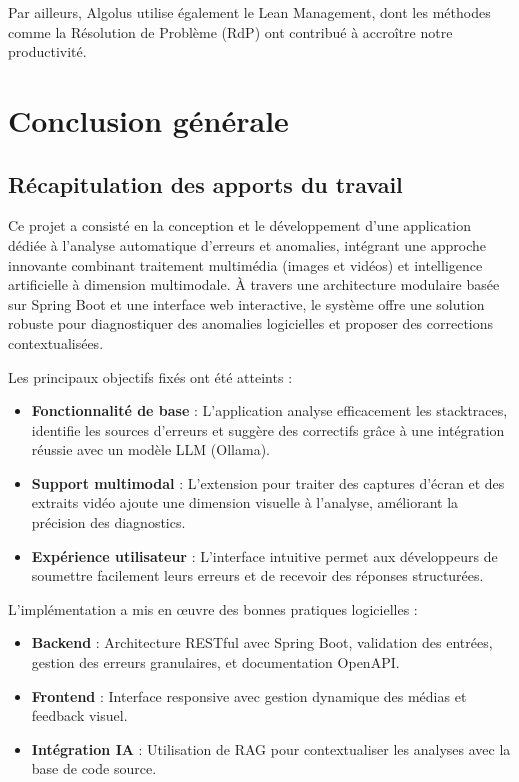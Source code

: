 \documentclass[12pt,a4paper]{report}
\begin{document}
	Par ailleurs, Algolus utilise également le Lean Management, dont les méthodes comme la Résolution de Problème (RdP) ont contribué à accroître notre productivité.
	
	\chapter*{Conclusion générale}
	
	\section*{Récapitulation des apports du travail}
	
	Ce projet a consisté en la conception et le développement d'une application dédiée à l'analyse automatique d'erreurs et anomalies, intégrant une approche innovante combinant traitement multimédia (images et vidéos) et intelligence artificielle à dimension multimodale. À travers une architecture modulaire basée sur Spring Boot et une interface web interactive, le système offre une solution robuste pour diagnostiquer des anomalies logicielles et proposer des corrections contextualisées.
	
	Les principaux objectifs fixés ont été atteints :  
	
	\begin{itemize}
		
		\item \textbf{Fonctionnalité de base} : L'application analyse efficacement les stacktraces,  identifie les sources d'erreurs et suggère des correctifs grâce à une intégration réussie avec un modèle LLM (Ollama).
		
		\item \textbf{Support multimodal} : L'extension pour traiter des captures d'écran et des extraits vidéo ajoute une dimension visuelle à l'analyse, améliorant la précision des diagnostics.
		
		\item \textbf{Expérience utilisateur} : L'interface intuitive permet aux développeurs de soumettre facilement leurs erreurs et de recevoir des réponses structurées.
		
	\end{itemize}

	L'implémentation a mis en œuvre des bonnes pratiques logicielles :
	
	\begin{itemize}
		
		\item \textbf{Backend} : Architecture RESTful avec Spring Boot, validation des entrées, gestion des erreurs granulaires, et documentation OpenAPI.
		
		\item \textbf{Frontend} : Interface responsive avec gestion dynamique des médias et feedback visuel.
		
		\item \textbf{Intégration IA} : Utilisation de RAG pour contextualiser les analyses avec la base de code source. 
		
	\end{itemize}
	
\end{document}
